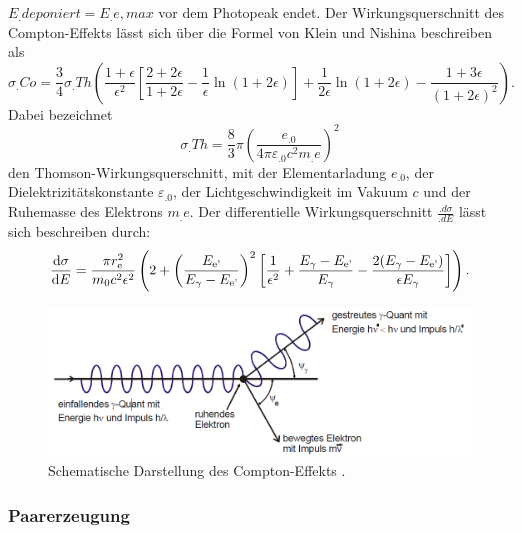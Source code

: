$E_.{deponiert}=E_.{e,max}$ vor dem Photopeak endet.
Der Wirkungsquerschnitt des Compton-Effekts lässt sich über die Formel von Klein und Nishina beschreiben als
\begin{equation}
\sigma_.{Co}=\frac{3}{4}\sigma_.{Th}\left(\frac{1+\epsilon}{\epsilon^2}\left[\frac{2+2\epsilon}{1+2\epsilon}-\frac{1}{\epsilon}\ln(1+2\epsilon)\right]+\frac{1}{2\epsilon}\ln(1+2\epsilon)-\frac{1+3\epsilon}{(1+2\epsilon)^2}\right)\text{.}\label{eq:sig_Co}
\end{equation}
Dabei bezeichnet 
\[
\sigma_.{Th}=\frac{8}{3}\pi\left(\frac{e_.0}{4\pi\varepsilon_.0c^2m_.e}\right)^2
\] 
den Thomson-Wirkungsquerschnitt, mit der Elementarladung $e_.0$, der Dielektrizitätskonstante $\varepsilon_.0$, der Lichtgeschwindigkeit im Vakuum $c$ und der Ruhemasse des Elektrons $m_.e$.
Der differentielle Wirkungsquerschnitt $\frac{.d\sigma}{.dE}$ lässt sich beschreiben durch:
\begin{equation}
\frac{\mathop{}\!\mathrm{d} \sigma}{\mathop{}\!\mathrm{d} E} =  \frac{\pi r_\text{e}^2}{m_0 c^2 \epsilon^2}\left(2+\left(\frac{E_\text{e'}}{E_\gamma - E_\text{e'}}\right)^2 \left[ \frac{1}{\epsilon^2} +\frac{E_\gamma - E_\text{e'}}{E_\gamma} - \frac{2(E_\gamma - E_\text{e'})}{\epsilon E_\gamma} \right]\right) \text{.}\label{eq:sigmadiff}
\end{equation}

\begin{figure}
	\centering
	\includegraphics[width=\linewidth-50pt,height=\textheight-50pt,keepaspectratio]{content/images/Compton.pdf}
	\caption{Schematische Darstellung des Compton-Effekts \cite{V18}.}
	\label{fig:Compton}
\end{figure}

\subsubsection{Paarerzeugung}

